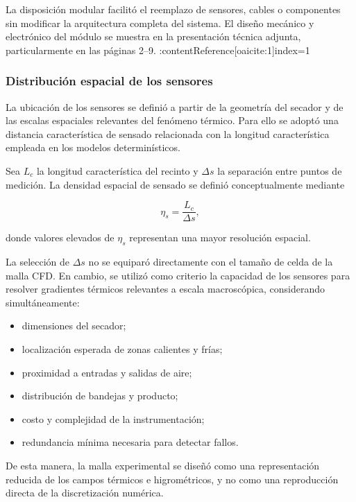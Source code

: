 La disposición modular facilitó el reemplazo de sensores, cables o componentes sin modificar la arquitectura completa del sistema. El diseño mecánico y electrónico del módulo se muestra en la presentación técnica adjunta, particularmente en las páginas 2--9. :contentReference[oaicite:1]{index=1}

\subsubsection{Distribución espacial de los sensores}
\label{subsubsec:distribucion_sensores}

La ubicación de los sensores se definió a partir de la geometría del secador y de las escalas espaciales relevantes del fenómeno térmico. Para ello se adoptó una distancia característica de sensado relacionada con la longitud característica empleada en los modelos determinísticos.

Sea $L_c$ la longitud característica del recinto y $\Delta s$ la separación entre puntos de medición. La densidad espacial de sensado se definió conceptualmente mediante

\begin{equation}
\eta_s
=
\frac{L_c}{\Delta s},
\label{eq:densidad_sensado}
\end{equation}

donde valores elevados de $\eta_s$ representan una mayor resolución espacial.

La selección de $\Delta s$ no se equiparó directamente con el tamaño de celda de la malla CFD. En cambio, se utilizó como criterio la capacidad de los sensores para resolver gradientes térmicos relevantes a escala macroscópica, considerando simultáneamente:

\begin{itemize}
    \item dimensiones del secador;
    \item localización esperada de zonas calientes y frías;
    \item proximidad a entradas y salidas de aire;
    \item distribución de bandejas y producto;
    \item costo y complejidad de la instrumentación;
    \item redundancia mínima necesaria para detectar fallos.
\end{itemize}

De esta manera, la malla experimental se diseñó como una representación reducida de los campos térmicos e higrométricos, y no como una reproducción directa de la discretización numérica.

